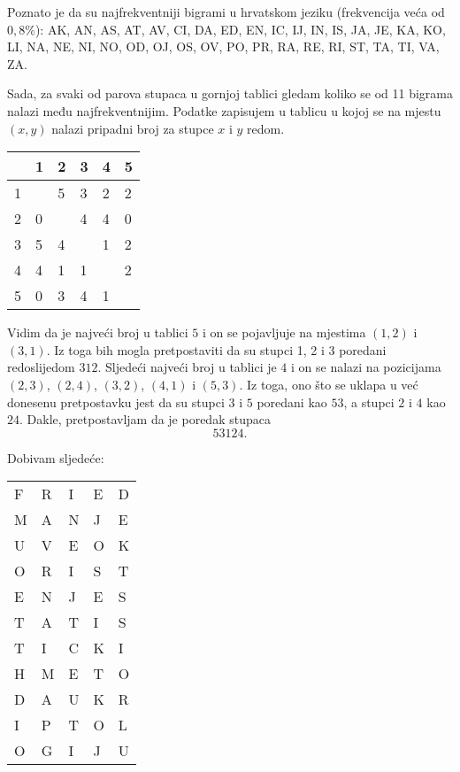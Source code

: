 \documentclass[a4paper,12pt,oneside]{article}
\begin{document}
\noindent Poznato je da su najfrekventniji bigrami u hrvatskom jeziku (frekvencija veća od $0,8\%$):
AK, AN, AS, AT, AV, CI, DA, ED, EN, IC, IJ, IN, IS, JA, JE, KA, KO, LI,
NA, NE, NI, NO, OD, OJ, OS, OV, PO, PR, RA, RE, RI, ST, TA, TI, VA, ZA.

\noindent Sada, za svaki od parova stupaca u gornjoj tablici gledam koliko se od 11 bigrama nalazi među najfrekventnijim. Podatke zapisujem u tablicu u kojoj se na mjestu $(x, y)$ nalazi pripadni broj za stupce $x$ i $y$ redom.

\begin{table}[h!]
	\centering
	\begin{tabular}{l|lllll}
		  & 1 & 2 & 3 & 4 & 5\\
		\hline
		1 &  & 5 & 3 & 2 & 2\\
		2 & 0 &  & 4 & 4 & 0 \\
		3 & 5 & 4 &  & 1 & 2\\
		4 & 4 & 1 & 1 &  & 2 \\
		5 & 0 & 3 & 4 & 1 & \\
	\end{tabular}
\end{table}
\noindent Vidim da je najveći broj u tablici $5$ i on se pojavljuje na mjestima $(1, 2)$ i $(3, 1)$. Iz toga bih mogla pretpostaviti da su stupci 1, 2 i 3 poredani redoslijedom $312$. Sljedeći najveći broj u tablici je $4$ i on se nalazi na pozicijama $(2, 3)$, $(2, 4)$, $(3, 2)$, $(4, 1)$ i $(5, 3)$. Iz toga, ono što se uklapa u već donesenu pretpostavku jest da su stupci $3$ i $5$ poredani kao $53$, a stupci $2$ i $4$ kao $24$. Dakle, pretpostavljam da je poredak stupaca 
$$53124.$$

\noindent Dobivam sljedeće:

\begin{table}[h!]
	\begin{tabular}{lllll}
		F & R & I & E & D \\
		M & A & N & J & E \\
		U & V & E & O & K \\
		O & R & I & S & T \\
		E & N & J & E & S \\
		T & A & T & I & S \\
		T & I & C & K & I \\
		H & M & E & T & O \\
		D & A & U & K & R \\
		I & P & T & O & L \\
		O & G & I & J & U \\
	\end{tabular}
\end{table}
\end{document}
